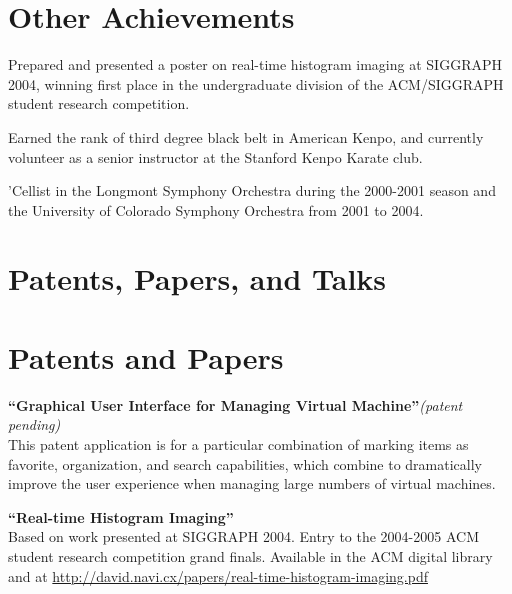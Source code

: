 \documentclass[margin,line]{resume}
\begin{document}
\begin{resume}
    \section{\mysidestyle Other Achievements}

    \begin{list1}
    \item Prepared and presented a poster on real-time histogram imaging at
          SIGGRAPH 2004, winning first place in the undergraduate division
          of the ACM/SIGGRAPH student research competition.
    \item Earned the rank of third degree black belt in American Kenpo, and
          currently volunteer as a senior instructor at the Stanford Kenpo
          Karate club.
    \ifcv
        \item 'Cellist in the Longmont Symphony Orchestra during the 2000-2001
              season and the University of Colorado Symphony Orchestra from 2001
              to 2004.
    \fi
    \end{list1}

    \ifcv
        \newpage
    \fi

    \ifcv
        \section{\mysidestyle Patents, Papers, and Talks}
    \else
        \section{\mysidestyle Patents and Papers}
    \fi

    {\bf``Graphical User Interface for Managing Virtual Machine''}{\it (patent pending)} \vspace{2mm}\\\vspace{1mm}%
    This patent application is for a particular combination of marking
    items as favorite, organization, and search capabilities, which combine
    to dramatically improve the user experience when managing large numbers
    of virtual machines.

    {\bf``Real-time Histogram Imaging''} \vspace{2mm}\\\vspace{1mm}%
    Based on work presented at SIGGRAPH 2004.  Entry to the 2004-2005 ACM
    student research competition grand finals. Available in the ACM digital
    library and at
    \url{http://david.navi.cx/papers/real-time-histogram-imaging.pdf}


\end{resume}
\end{document}
